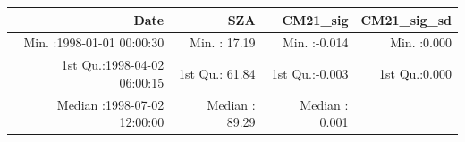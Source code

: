 \documentclass[
  10pt,
  a4paper,oneside]{article}
\begin{document}
\begin{longtable}[]{@{}rrrr@{}}
\toprule
\begin{minipage}[b]{0.33\columnwidth}\raggedleft
Date\strut
\end{minipage} & \begin{minipage}[b]{0.19\columnwidth}\raggedleft
SZA\strut
\end{minipage} & \begin{minipage}[b]{0.19\columnwidth}\raggedleft
CM21\_sig\strut
\end{minipage} & \begin{minipage}[b]{0.19\columnwidth}\raggedleft
CM21\_sig\_sd\strut
\end{minipage}\tabularnewline
\midrule
\endhead
\begin{minipage}[t]{0.33\columnwidth}\raggedleft
Min. :1998-01-01 00:00:30\strut
\end{minipage} & \begin{minipage}[t]{0.19\columnwidth}\raggedleft
Min. : 17.19\strut
\end{minipage} & \begin{minipage}[t]{0.19\columnwidth}\raggedleft
Min. :-0.014\strut
\end{minipage} & \begin{minipage}[t]{0.19\columnwidth}\raggedleft
Min. :0.000\strut
\end{minipage}\tabularnewline
\begin{minipage}[t]{0.33\columnwidth}\raggedleft
1st Qu.:1998-04-02 06:00:15\strut
\end{minipage} & \begin{minipage}[t]{0.19\columnwidth}\raggedleft
1st Qu.: 61.84\strut
\end{minipage} & \begin{minipage}[t]{0.19\columnwidth}\raggedleft
1st Qu.:-0.003\strut
\end{minipage} & \begin{minipage}[t]{0.19\columnwidth}\raggedleft
1st Qu.:0.000\strut
\end{minipage}\tabularnewline
\begin{minipage}[t]{0.33\columnwidth}\raggedleft
Median :1998-07-02 12:00:00\strut
\end{minipage} & \begin{minipage}[t]{0.19\columnwidth}\raggedleft
Median : 89.29\strut
\end{minipage} & \begin{minipage}[t]{0.19\columnwidth}\raggedleft
Median : 0.001\strut
\end{minipage} & \begin{minipage}[t]{0.19\columnwidth}\raggedleft

\end{minipage}
\end{longtable}
\end{document}
